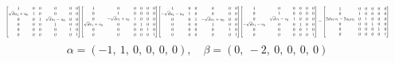 \documentclass[11pt]{article}
\theoremstyle{definition}
\begin{document}
\[
\scaletoalign{\textwidth}{{\left[\begin{matrix}1 & 0 & 0 & 0 & 0 & 0\\\sqrt{d} u_{1} + u_{0} & 1 & 0 & 0 & 0 & 0\\0 & 0 & 1 & \sqrt{d} u_{1} - u_{0} & 0 & 0\\0 & 0 & 0 & 1 & 0 & 0\\0 & 0 & 0 & 0 & 1 & 0\\0 & 0 & 0 & 0 & 0 & 1\end{matrix}\right]} {\left[\begin{matrix}1 & 0 & 0 & 0 & 0 & 0\\0 & 1 & 0 & 0 & 0 & 0\\0 & - \sqrt{d} v_{1} + v_{0} & 1 & 0 & 0 & 0\\\sqrt{d} v_{1} + v_{0} & 0 & 0 & 1 & 0 & 0\\0 & 0 & 0 & 0 & 1 & 0\\0 & 0 & 0 & 0 & 0 & 1\end{matrix}\right]} {\left[\begin{matrix}1 & 0 & 0 & 0 & 0 & 0\\- \sqrt{d} u_{1} - u_{0} & 1 & 0 & 0 & 0 & 0\\0 & 0 & 1 & - \sqrt{d} u_{1} + u_{0} & 0 & 0\\0 & 0 & 0 & 1 & 0 & 0\\0 & 0 & 0 & 0 & 1 & 0\\0 & 0 & 0 & 0 & 0 & 1\end{matrix}\right]} {\left[\begin{matrix}1 & 0 & 0 & 0 & 0 & 0\\0 & 1 & 0 & 0 & 0 & 0\\0 & \sqrt{d} v_{1} - v_{0} & 1 & 0 & 0 & 0\\- \sqrt{d} v_{1} - v_{0} & 0 & 0 & 1 & 0 & 0\\0 & 0 & 0 & 0 & 1 & 0\\0 & 0 & 0 & 0 & 0 & 1\end{matrix}\right]} = {\left[\begin{matrix}1 & 0 & 0 & 0 & 0 & 0\\0 & 1 & 0 & 0 & 0 & 0\\2 d u_{1} v_{1} - 2 u_{0} v_{0} & 0 & 1 & 0 & 0 & 0\\0 & 0 & 0 & 1 & 0 & 0\\0 & 0 & 0 & 0 & 1 & 0\\0 & 0 & 0 & 0 & 0 & 1\end{matrix}\right]}}
\]
\[
\alpha = \left( -1, \  1, \  0, \  0, \  0, \  0\right), \quad \beta = \left( 0, \  -2, \  0, \  0, \  0, \  0\right)
\]
\end{document}
